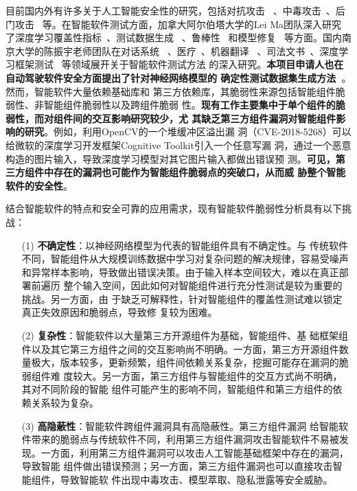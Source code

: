 
目前国内外有许多关于人工智能安全性的研究，包括对抗攻击
~\cite{szegedy2013intriguing}、中毒攻击~\cite{zhao2020shielding}、后门攻击
~\cite{ge2021anti}等。在智能软件测试方面，加拿大阿尔伯塔大学的Lei Ma团队深入研究
了深度学习覆盖性指标~\cite{ma2018deepgauge,ma2019deepct}、测试数据生成
~\cite{xie2019coverage,xie2019deephunter}、鲁棒性
~\cite{wang2020deepsonar,sun2020stealthy,zhang2020generating}和模型修复
~\cite{yu2021deeprepair}等方面。国内南京大学的陈振宇老师团队在对话系统
~\cite{liu2021dialtest}、医疗~\cite{hou2021taumed}、机器翻译
~\cite{ji2021automated}、司法文书~\cite{guo2020taujud}、深度学习框架测试
~\cite{zhang2021duo,zhang2021predoo,luo2021graph}等领域展开关于智能软件测试方法
的深入研究。\textbf{本项目申请人也在自动驾驶软件安全方面提出了针对神经网络模型的
确定性测试数据集生成方法~\cite{xu2021deepsuite}}。然而，智能软件大量依赖基础库和
第三方依赖库，其脆弱性来源包括智能组件脆弱性、非智能组件脆弱性以及跨组件脆弱
性。\textbf{现有工作主要集中于单个组件的脆弱性，而对组件间的交互影响研究较少，尤
其缺乏第三方组件漏洞对智能组件影响的研究}。例如，利用OpenCV的一个堆缓冲区溢出漏
洞（CVE-2018-5268）可以给微软的深度学习开发框架Cognitive Toolkit引入一个任意写漏
洞，通过一个恶意构造的图片输入，导致深度学习模型对其它图片输入都做出错误预
测。\textbf{可见，第三方组件中存在的漏洞也可能作为智能组件脆弱点的突破口，从而威
胁整个智能软件的安全性}。


结合智能软件的特点和安全可靠的应用需求，现有智能软件脆弱性分析具有以下挑战：

\begin{itemize}
    \item[(1)]\textbf{不确定性}：以神经网络模型为代表的智能组件具有不确定性。与
    传统软件不同，智能组件从大规模训练数据中学习对复杂问题的解决规律，容易受噪声
    和异常样本影响，导致做出错误决策。由于输入样本空间较大，难以在真正部署前遍历
    整个输入空间，因此如何对智能组件进行充分性测试是较为重要的挑战。另一方面，由
    于缺乏可解释性，针对智能组件的覆盖性测试难以锁定真正失效原因和脆弱点，导致修
    复较为困难。
    \item[(2)]\textbf{复杂性}：智能软件以大量第三方开源组件为基础，智能组件、基
    础框架组件以及其它第三方组件之间的交互影响尚不明确。一方面，第三方开源组件数
    量极大，版本较多，更新频繁，组件间依赖关系复杂，挖掘可能存在漏洞的脆弱组件难
    度较大。另一方面，第三方组件与智能组件的交互方式尚不明确，其对不同阶段的智能
    组件可能产生的影响不同，智能组件和第三方组件的依赖关系较为复杂。
    \item[(3)]\textbf{高隐蔽性}：智能软件跨组件漏洞具有高隐蔽性。第三方组件漏洞
    给智能软件带来的脆弱点与传统软件不同，利用第三方组件漏洞攻击智能软件不易被发
    现。一方面，利用第三方组件漏洞可以攻击人工智能基础框架中存在的漏洞，导致智能
    组件做出错误预测；另一方面，第三方组件漏洞也可以直接攻击智能组件，导致智能软
    件出现中毒攻击、模型萃取、隐私泄露等安全威胁。
\end{itemize}


